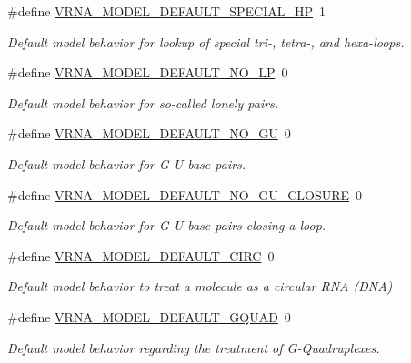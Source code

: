 \begin{DoxyCompactItemize}
\#define \hyperlink{group__model__details_gabd1ab224e1048defd45c165ed7d1c108}{V\+R\+N\+A\+\_\+\+M\+O\+D\+E\+L\+\_\+\+D\+E\+F\+A\+U\+L\+T\+\_\+\+S\+P\+E\+C\+I\+A\+L\+\_\+\+HP}~1
\begin{DoxyCompactList}\small\item\em Default model behavior for lookup of special tri-\/, tetra-\/, and hexa-\/loops. \end{DoxyCompactList}\item 
\#define \hyperlink{group__model__details_gab72462726dd60ed0d43339bbf7ee08ad}{V\+R\+N\+A\+\_\+\+M\+O\+D\+E\+L\+\_\+\+D\+E\+F\+A\+U\+L\+T\+\_\+\+N\+O\+\_\+\+LP}~0
\begin{DoxyCompactList}\small\item\em Default model behavior for so-\/called \textquotesingle{}lonely pairs\textquotesingle{}. \end{DoxyCompactList}\item 
\#define \hyperlink{group__model__details_ga34702f7d14d38b877ba8e475281e97e2}{V\+R\+N\+A\+\_\+\+M\+O\+D\+E\+L\+\_\+\+D\+E\+F\+A\+U\+L\+T\+\_\+\+N\+O\+\_\+\+GU}~0
\begin{DoxyCompactList}\small\item\em Default model behavior for G-\/U base pairs. \end{DoxyCompactList}\item 
\#define \hyperlink{group__model__details_ga5308de46faaca4b9fd16045864901ee7}{V\+R\+N\+A\+\_\+\+M\+O\+D\+E\+L\+\_\+\+D\+E\+F\+A\+U\+L\+T\+\_\+\+N\+O\+\_\+\+G\+U\+\_\+\+C\+L\+O\+S\+U\+RE}~0
\begin{DoxyCompactList}\small\item\em Default model behavior for G-\/U base pairs closing a loop. \end{DoxyCompactList}\item 
\#define \hyperlink{group__model__details_ga22059033db7bcd875c51fec32425490a}{V\+R\+N\+A\+\_\+\+M\+O\+D\+E\+L\+\_\+\+D\+E\+F\+A\+U\+L\+T\+\_\+\+C\+I\+RC}~0
\begin{DoxyCompactList}\small\item\em Default model behavior to treat a molecule as a circular R\+NA (D\+NA) \end{DoxyCompactList}\item 
\#define \hyperlink{group__model__details_ga793ed812e86f43799b14b2deee917f23}{V\+R\+N\+A\+\_\+\+M\+O\+D\+E\+L\+\_\+\+D\+E\+F\+A\+U\+L\+T\+\_\+\+G\+Q\+U\+AD}~0
\begin{DoxyCompactList}\small\item\em Default model behavior regarding the treatment of G-\/\+Quadruplexes. \end{DoxyCompactList}\item 

\end{DoxyCompactItemize}

